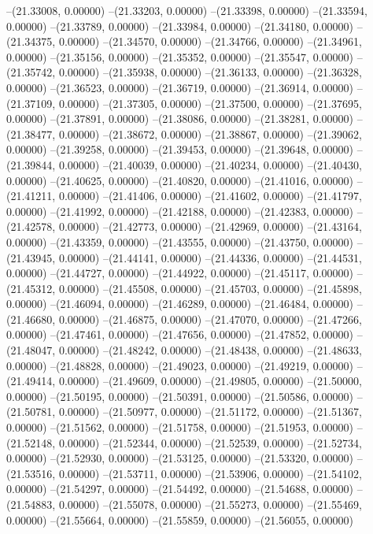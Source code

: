--(21.33008, 0.00000)
--(21.33203, 0.00000)
--(21.33398, 0.00000)
--(21.33594, 0.00000)
--(21.33789, 0.00000)
--(21.33984, 0.00000)
--(21.34180, 0.00000)
--(21.34375, 0.00000)
--(21.34570, 0.00000)
--(21.34766, 0.00000)
--(21.34961, 0.00000)
--(21.35156, 0.00000)
--(21.35352, 0.00000)
--(21.35547, 0.00000)
--(21.35742, 0.00000)
--(21.35938, 0.00000)
--(21.36133, 0.00000)
--(21.36328, 0.00000)
--(21.36523, 0.00000)
--(21.36719, 0.00000)
--(21.36914, 0.00000)
--(21.37109, 0.00000)
--(21.37305, 0.00000)
--(21.37500, 0.00000)
--(21.37695, 0.00000)
--(21.37891, 0.00000)
--(21.38086, 0.00000)
--(21.38281, 0.00000)
--(21.38477, 0.00000)
--(21.38672, 0.00000)
--(21.38867, 0.00000)
--(21.39062, 0.00000)
--(21.39258, 0.00000)
--(21.39453, 0.00000)
--(21.39648, 0.00000)
--(21.39844, 0.00000)
--(21.40039, 0.00000)
--(21.40234, 0.00000)
--(21.40430, 0.00000)
--(21.40625, 0.00000)
--(21.40820, 0.00000)
--(21.41016, 0.00000)
--(21.41211, 0.00000)
--(21.41406, 0.00000)
--(21.41602, 0.00000)
--(21.41797, 0.00000)
--(21.41992, 0.00000)
--(21.42188, 0.00000)
--(21.42383, 0.00000)
--(21.42578, 0.00000)
--(21.42773, 0.00000)
--(21.42969, 0.00000)
--(21.43164, 0.00000)
--(21.43359, 0.00000)
--(21.43555, 0.00000)
--(21.43750, 0.00000)
--(21.43945, 0.00000)
--(21.44141, 0.00000)
--(21.44336, 0.00000)
--(21.44531, 0.00000)
--(21.44727, 0.00000)
--(21.44922, 0.00000)
--(21.45117, 0.00000)
--(21.45312, 0.00000)
--(21.45508, 0.00000)
--(21.45703, 0.00000)
--(21.45898, 0.00000)
--(21.46094, 0.00000)
--(21.46289, 0.00000)
--(21.46484, 0.00000)
--(21.46680, 0.00000)
--(21.46875, 0.00000)
--(21.47070, 0.00000)
--(21.47266, 0.00000)
--(21.47461, 0.00000)
--(21.47656, 0.00000)
--(21.47852, 0.00000)
--(21.48047, 0.00000)
--(21.48242, 0.00000)
--(21.48438, 0.00000)
--(21.48633, 0.00000)
--(21.48828, 0.00000)
--(21.49023, 0.00000)
--(21.49219, 0.00000)
--(21.49414, 0.00000)
--(21.49609, 0.00000)
--(21.49805, 0.00000)
--(21.50000, 0.00000)
--(21.50195, 0.00000)
--(21.50391, 0.00000)
--(21.50586, 0.00000)
--(21.50781, 0.00000)
--(21.50977, 0.00000)
--(21.51172, 0.00000)
--(21.51367, 0.00000)
--(21.51562, 0.00000)
--(21.51758, 0.00000)
--(21.51953, 0.00000)
--(21.52148, 0.00000)
--(21.52344, 0.00000)
--(21.52539, 0.00000)
--(21.52734, 0.00000)
--(21.52930, 0.00000)
--(21.53125, 0.00000)
--(21.53320, 0.00000)
--(21.53516, 0.00000)
--(21.53711, 0.00000)
--(21.53906, 0.00000)
--(21.54102, 0.00000)
--(21.54297, 0.00000)
--(21.54492, 0.00000)
--(21.54688, 0.00000)
--(21.54883, 0.00000)
--(21.55078, 0.00000)
--(21.55273, 0.00000)
--(21.55469, 0.00000)
--(21.55664, 0.00000)
--(21.55859, 0.00000)
--(21.56055, 0.00000)
